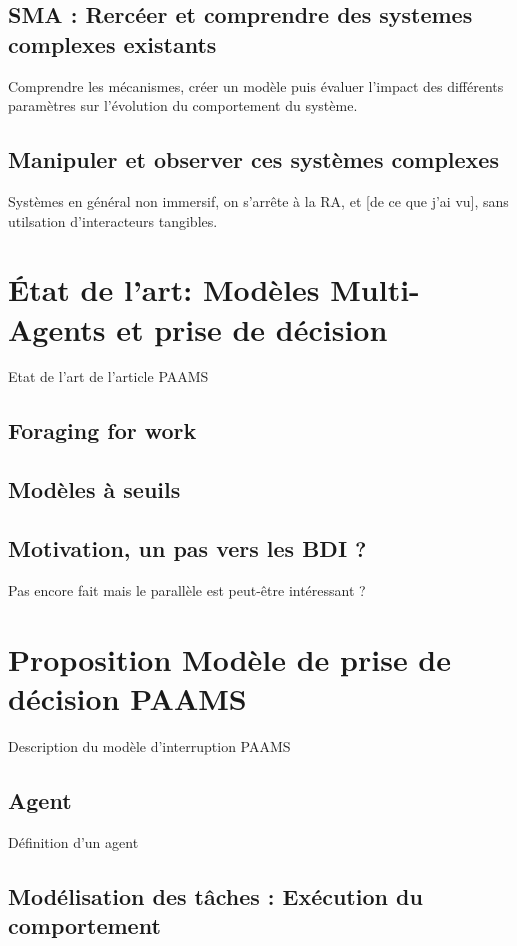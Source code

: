 \documentclass[11pt,a4paper]{article}
\begin{document}
	\subsection{SMA : Rercéer et comprendre des systemes complexes existants}
		Comprendre les mécanismes, créer un modèle puis évaluer l'impact des différents paramètres sur l'évolution du comportement du système.
	\subsection{Manipuler et observer ces systèmes complexes}
		Systèmes en général non immersif, on s'arrête à la RA, et [de ce que j'ai vu], sans utilsation d'interacteurs tangibles.
\section{État de l'art: Modèles Multi-Agents et prise de décision}
	Etat de l'art de l'article PAAMS
	\subsection{Foraging for work}
	\subsection{Modèles à seuils}
	\subsection{Motivation, un pas vers les BDI ?}
		Pas encore fait mais le parallèle est peut-être intéressant ?
\section{Proposition Modèle de prise de décision PAAMS}
	Description du modèle d'interruption PAAMS	
	
	\subsection{Agent}
		Définition d'un agent
	
	\subsection{Modélisation des tâches : Exécution du comportement}	
	
\end{document}

